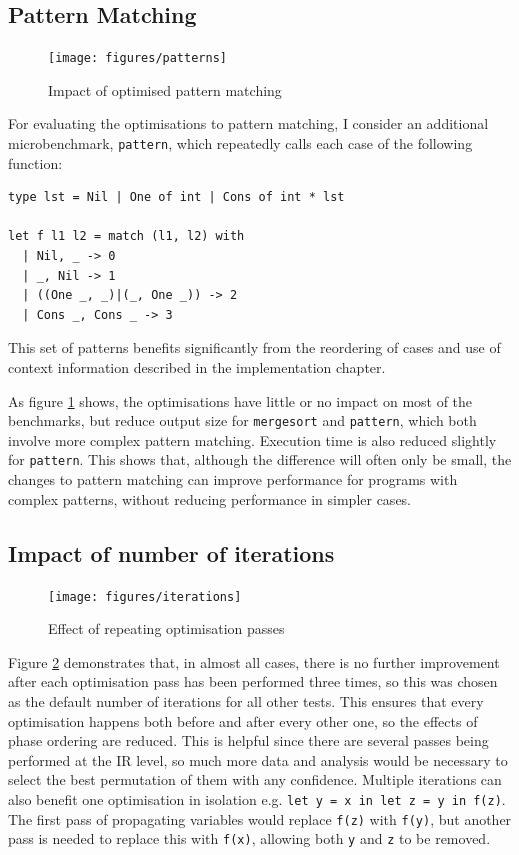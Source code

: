\subsection{Pattern Matching}
\begin{figure}[H]
\texttt{[image: figures/patterns]}
\vspace{-0.8cm}
\caption{Impact of optimised pattern matching}
 \label{fig:patterns} 
\end{figure}

For evaluating the optimisations to pattern matching, I consider an additional microbenchmark, \verb|pattern|, which repeatedly calls each case of the following function:
\begin{verbatim}
type lst = Nil | One of int | Cons of int * lst

let f l1 l2 = match (l1, l2) with
  | Nil, _ -> 0
  | _, Nil -> 1
  | ((One _, _)|(_, One _)) -> 2
  | Cons _, Cons _ -> 3
\end{verbatim}
This set of patterns benefits significantly from the reordering of cases  and use of context information described in the implementation chapter. 


As figure \ref{fig:patterns} shows, the optimisations have little or no impact on most of the benchmarks, but reduce output size for \verb|mergesort| and \verb|pattern|, which both involve more complex pattern matching. Execution time is also reduced slightly for \verb|pattern|. This shows that, although the difference will often only be small, the changes to pattern matching can improve performance for programs with complex patterns, without reducing performance in simpler cases.

\subsection{Impact of number of iterations}

\begin{figure}[H]
\hfill
\texttt{[image: figures/iterations]} \hfill
\vspace{-0.3cm}
\caption{Effect of repeating optimisation passes}
 \label{fig:iterations} 
\end{figure}

Figure \ref{fig:iterations} demonstrates that, in almost all cases, there is no further improvement after each optimisation pass has been performed three times, so this was chosen as the default number of iterations for all other tests. This ensures that every optimisation happens both before and after every other one, so the effects of phase ordering are reduced. This is helpful since there are several passes being performed at the IR level, so much more data and analysis would be necessary to select the best permutation of them with any confidence.
Multiple iterations can also benefit one optimisation in isolation e.g. \verb|let y = x in let z = y in f(z)|. The first pass of propagating variables would replace \verb|f(z)| with \verb|f(y)|, but another pass is needed to replace this with \verb|f(x)|, allowing both \verb|y| and \verb|z| to be removed.


